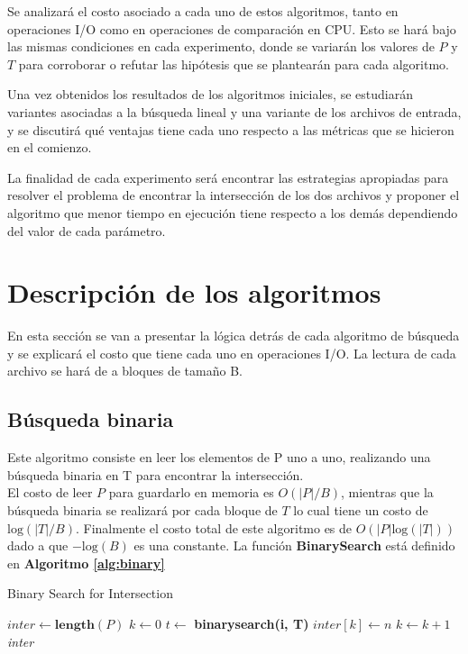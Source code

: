 \documentclass[11pt]{article}
\begin{document}
Se analizará el costo asociado a cada uno de estos algoritmos, tanto en operaciones I/O como en operaciones de comparación en CPU. Esto se hará bajo las mismas condiciones en cada experimento, donde se variarán los valores de $P$ y $T$ para corroborar o refutar las hipótesis que se plantearán para cada algoritmo.

Una vez obtenidos los resultados de los algoritmos iniciales, se estudiarán variantes asociadas a la búsqueda lineal y una variante de los archivos de entrada, y se discutirá qué ventajas tiene cada uno respecto a las métricas que se hicieron en el comienzo.

La finalidad de cada experimento será encontrar las estrategias apropiadas para resolver el problema de encontrar la intersección de los dos archivos y proponer el algoritmo que menor tiempo en ejecución tiene respecto a los demás dependiendo del valor de cada parámetro.

\newpage
\section{Descripción de los algoritmos}
En esta sección se van a presentar la lógica detrás de cada algoritmo de búsqueda y se explicará el costo que tiene cada uno en operaciones I/O. La lectura de cada archivo se hará de a bloques de tamaño B.

\subsection{Búsqueda binaria} 
Este algoritmo consiste en leer los elementos de P uno a uno, realizando una búsqueda binaria en T para encontrar la intersección.\\
El costo de leer $P$ para guardarlo en memoria es $O(|P|/B)$, mientras que la búsqueda binaria se realizará por cada bloque de $T$ lo cual tiene un costo de $\text{log}(|T|/B)$. Finalmente el costo total de este algoritmo es de $O(|P|\text{log}(|T|))$ dado a que $-\text{log}(B)$ es una constante. La función \textbf{BinarySearch} está definido en \textbf{Algoritmo \ref{alg:binary}}

\begin{algorithm}
\caption{Binary Search for Intersection}
\label{alg:binary_search}
\begin{algorithmic}[1]
\State
{}
\State $\textit{inter} \gets \textbf{length}(P)$
\State $\textit{k} \gets 0$
\State $t \gets$ \textbf{binarysearch(i, T)}
    \State $inter[k] \gets n$
    \State $k \gets k + 1$
\EndIf
\EndFor
\State \Return \textit{inter}
\EndProcedure
\end{algorithmic}
\end{algorithm}
\end{document}
